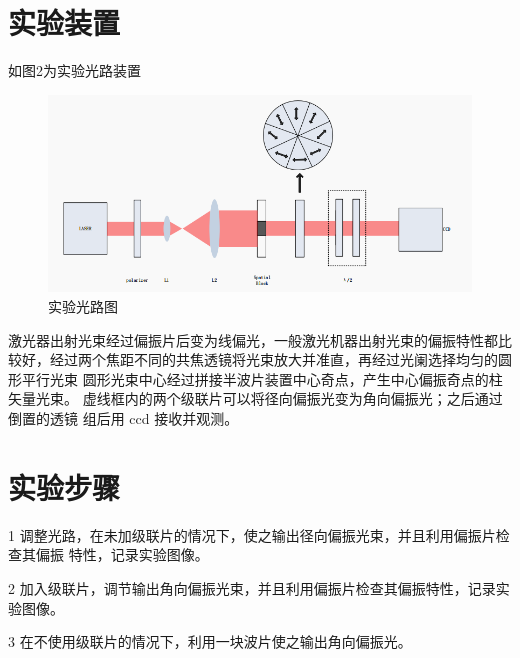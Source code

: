 \documentclass{article}
\begin{document}
\section{实验装置}

如图2为实验光路装置
	\begin{figure}[!h]
	
	\centering
	\includegraphics[scale=0.7]{光路图}
	\caption{\heiti{}实验光路图}
	
\end{figure}


激光器出射光束经过偏振片后变为线偏光，一般激光机器出射光束的偏振特性都比
较好，经过两个焦距不同的共焦透镜将光束放大并准直，再经过光阑选择均匀的圆形平行光束
圆形光束中心经过拼接半波片装置中心奇点，产生中心偏振奇点的柱矢量光束。
虚线框内的两个级联片可以将径向偏振光变为角向偏振光；之后通过倒置的透镜
组后用 ccd 接收并观测。

\section{实验步骤}
1 调整光路，在未加级联片的情况下，使之输出径向偏振光束，并且利用偏振片检查其偏振
特性，记录实验图像。


2 加入级联片，调节输出角向偏振光束，并且利用偏振片检查其偏振特性，记录实验图像。


3 在不使用级联片的情况下，利用一块波片使之输出角向偏振光。
\end{document}
